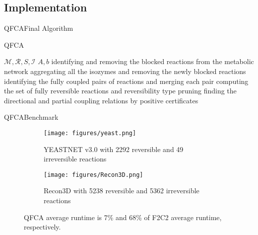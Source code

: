 \documentclass[10pt]{beamer}
\theoremstyle{remark}
\theoremstyle{definition}
\begin{document}
\subsection{Implementation}
\begin{frame}{QFCA}{Final Algorithm}


\begin{block}{QFCA}
\begin{algorithmic} \label{pseudocode}
\REQUIRE $\mathcal{M}, \mathcal{R}, S, \mathcal{I}$
\ENSURE $A, b$\pause
\STATE identifying and removing the blocked reactions from the metabolic network \pause
\STATE aggregating all the isozymes and removing the newly blocked reactions \pause
\STATE identifying the fully coupled pairs of reactions and merging each pair \pause
\STATE computing the set of fully reversible reactions and reversibility type pruning \pause
\STATE finding the directional and partial coupling relations by positive certificates 
\end{algorithmic}
\end{block}

\end{frame}

\begin{frame}{QFCA}{Benchmark}
\begin{figure}[ht]
    \centering
    \begin{subfigure}[b]{0.45\textwidth}
        \texttt{[image: figures/yeast.png]}
        \caption{YEASTNET v3.0 with 2292 reversible and 49 irreversible reactions}
    \end{subfigure}
    \qquad
    \begin{subfigure}[b]{0.45\textwidth}
        \texttt{[image: figures/Recon3D.png]}
        \caption{Recon3D with 5238 reversible and 5362 irreversible reactions}
    \end{subfigure}
    \caption{QFCA average runtime is 7\% and 68\%
    of F2C2 average runtime, respectively.}\label{fig:runtime}
\end{figure}

\end{frame}

\end{document}
